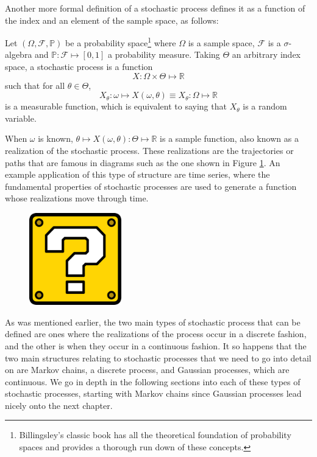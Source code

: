 Another more formal definition of a stochastic process defines it as a function of the index and an element of the sample space, as follows: 

\begin{definition}
	Let $(\Omega, \mathcal{F}, \mathbb{P})$ be a probability space\footnote{Billingsley's classic book \cite{billingsley2012probability} has all the theoretical foundation of probability spaces and provides a thorough run down of these concepts.} where $\Omega$ is a sample space, $\mathcal{F}$ is a $\sigma$-algebra and $\mathbb{P}: \mathcal{F} \mapsto [0,1]$ a probability measure. Taking $\Theta$ an arbitrary index space, a stochastic process is a function 
	\[ X: \Omega \times \Theta \mapsto \mathbb{R} \]
	such that for all  $\theta \in \Theta$,
	\[ X_\theta : \omega \mapsto X(\omega, \theta) \equiv X_\theta : \Omega \mapsto \mathbb{R} \]
	is a measurable function, which is equivalent to saying that $X_\theta$ is a random variable.
\end{definition}

When $\omega$ is known, $\theta \mapsto X(\omega, \theta): \Theta \mapsto \mathbb{R}$ is a sample function, also known as a realization of the stochastic process. These realizations are the trajectories or paths that are famous in diagrams such as the one shown in Figure \ref{trajectories}. An example application of this type of structure are time series, where the fundamental properties of stochastic processes are used to generate a function whose realizations move through time. 

\begin{figure}[h]
	\includegraphics[width=4cm]{Figures/missing.png}
	\centering
	\label{trajectories}
\end{figure}

As was mentioned earlier, the two main types of stochastic process that can be defined are ones where the realizations of the process occur in a discrete fashion, and the other is when they occur in a continuous fashion. It so happens that the two main structures relating to stochastic processes that we need to go into detail on are Markov chains, a discrete process, and Gaussian processes, which are continuous. We go in depth in the following sections into each of these types of stochastic processes, starting with Markov chains since Gaussian processes lead nicely onto the next chapter. 

